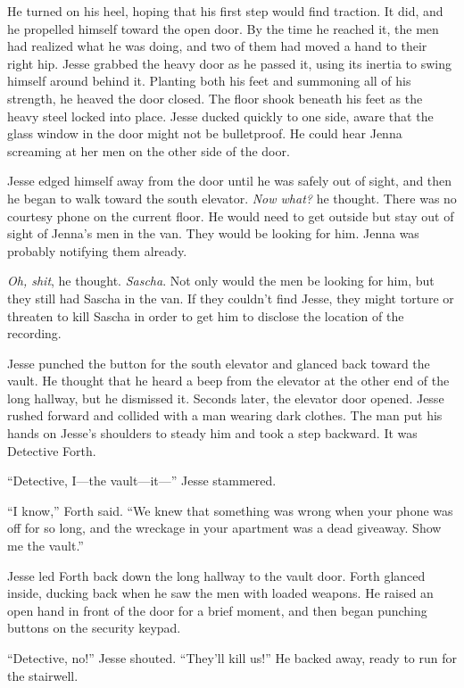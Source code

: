 \documentclass[12pt]{book}
\begin{document}
He turned on his heel, hoping that his first step would find traction.  It did, and he propelled himself toward the open door.  By the time he reached it, the men had realized what he was doing, and two of them had moved a hand to their right hip.  Jesse grabbed the heavy door as he passed it, using its inertia to swing himself around behind it.  Planting both his feet and summoning all of his strength, he heaved the door closed.  The floor shook beneath his feet as the heavy steel locked into place.  Jesse ducked quickly to one side, aware that the glass window in the door might not be bulletproof.  He could hear Jenna screaming at her men on the other side of the door.

Jesse edged himself away from the door until he was safely out of sight, and then he began to walk toward the south elevator.  \emph{Now what?} he thought.  There was no courtesy phone on the current floor.  He would need to get outside but stay out of sight of Jenna's men in the van.  They would be looking for him.  Jenna was probably notifying them already.

\emph{Oh, shit}, he thought.  \emph{Sascha}.  Not only would the men be looking for him, but they still had Sascha in the van.  If they couldn't find Jesse, they might torture or threaten to kill Sascha in order to get him to disclose the location of the recording.

Jesse punched the button for the south elevator and glanced back toward the vault.  He thought that he heard a beep from the elevator at the other end of the long hallway, but he dismissed it.  Seconds later, the elevator door opened.  Jesse rushed forward and collided with a man wearing dark clothes.  The man put his hands on Jesse's shoulders to steady him and took a step backward.  It was Detective Forth.

``Detective, I---the vault---it---'' Jesse stammered.

``I know,'' Forth said.  ``We knew that something was wrong when your phone was off for so long, and the wreckage in your apartment was a dead giveaway.  Show me the vault.''

Jesse led Forth back down the long hallway to the vault door.  Forth glanced inside, ducking back when he saw the men with loaded weapons.  He raised an open hand in front of the door for a brief moment, and then began punching buttons on the security keypad.

``Detective, no!'' Jesse shouted.  ``They'll kill us!''  He backed away, ready to run for the stairwell.
\end{document}
